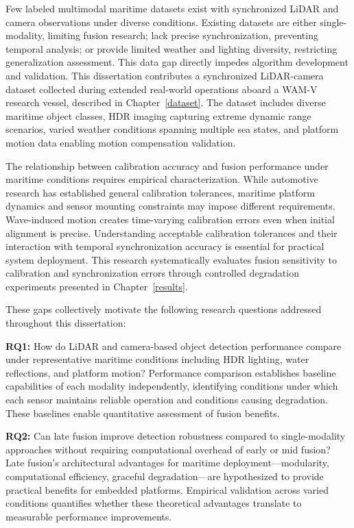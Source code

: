 \documentclass[../main.tex]{subfiles}
\begin{document}
Few labeled multimodal maritime datasets exist with synchronized LiDAR and camera observations under diverse conditions. Existing datasets are either single-modality, limiting fusion research; lack precise synchronization, preventing temporal analysis; or provide limited weather and lighting diversity, restricting generalization assessment. This data gap directly impedes algorithm development and validation. This dissertation contributes a synchronized LiDAR-camera dataset collected during extended real-world operations aboard a WAM-V research vessel, described in Chapter~\ref{dataset}. The dataset includes diverse maritime object classes, HDR imaging capturing extreme dynamic range scenarios, varied weather conditions spanning multiple sea states, and platform motion data enabling motion compensation validation.

The relationship between calibration accuracy and fusion performance under maritime conditions requires empirical characterization. While automotive research has established general calibration tolerances, maritime platform dynamics and sensor mounting constraints may impose different requirements. Wave-induced motion creates time-varying calibration errors even when initial alignment is precise. Understanding acceptable calibration tolerances and their interaction with temporal synchronization accuracy is essential for practical system deployment. This research systematically evaluates fusion sensitivity to calibration and synchronization errors through controlled degradation experiments presented in Chapter~\ref{results}.

These gaps collectively motivate the following research questions addressed throughout this dissertation:

\textbf{RQ1:} How do LiDAR and camera-based object detection performance compare under representative maritime conditions including HDR lighting, water reflections, and platform motion? Performance comparison establishes baseline capabilities of each modality independently, identifying conditions under which each sensor maintains reliable operation and conditions causing degradation. These baselines enable quantitative assessment of fusion benefits.

\textbf{RQ2:} Can late fusion improve detection robustness compared to single-modality approaches without requiring computational overhead of early or mid fusion? Late fusion's architectural advantages for maritime deployment—modularity, computational efficiency, graceful degradation—are hypothesized to provide practical benefits for embedded platforms. Empirical validation across varied conditions quantifies whether these theoretical advantages translate to measurable performance improvements.
\end{document}
